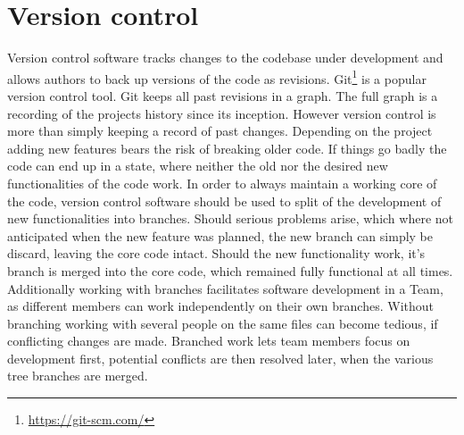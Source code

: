 \section{Version control}
Version control software tracks changes to the codebase under development and allows authors to back up versions of the code as revisions. Git\footnote{\url{https://git-scm.com/}} is a popular version control tool. Git keeps all past revisions in a graph. The full graph is a recording of the projects history since its inception. However version control is more than simply keeping a record of past changes. Depending on the project adding new features bears the risk of breaking older code. If things go badly the code can end up in a state, where neither the old nor the desired new functionalities of the code work. In order to always maintain a working core of the code, version control software should be used to split of the development of new functionalities into branches. Should serious problems arise, which where not anticipated when the new feature was planned, the new branch can simply be discard, leaving the core code intact. Should the new functionality work, it's branch is merged into the core code, which remained fully functional at all times.
Additionally working with branches facilitates software development in a Team, as different members can work independently on their own branches. Without branching working with several people on the same files can become tedious, if conflicting changes are made. Branched work lets team members focus on development first, potential conflicts are then resolved later, when the various tree branches are merged.